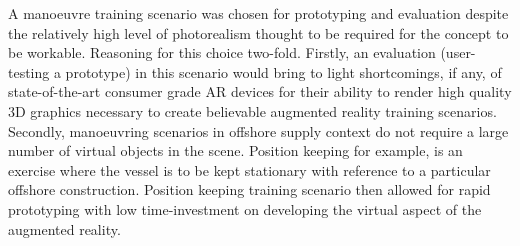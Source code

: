 A manoeuvre training scenario was chosen for prototyping and evaluation despite the relatively high level of photorealism thought to be required for the concept to be workable. Reasoning for this choice two-fold. Firstly, an evaluation (user-testing a prototype) in this scenario would bring to light shortcomings, if any, of state-of-the-art consumer grade AR devices for their ability to render high quality 3D graphics necessary to create believable augmented reality training scenarios. Secondly, manoeuvring scenarios in offshore supply context do not require a large number of virtual objects in the scene. Position keeping for example, is an exercise where the vessel is to be kept stationary with reference to a particular offshore construction. Position keeping training scenario then allowed for rapid prototyping with low time-investment on developing the virtual aspect of the augmented reality.

